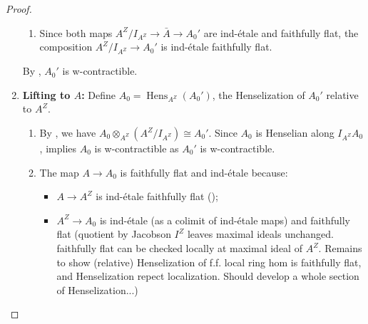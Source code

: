 \begin{proof}
\begin{enumerate}
\begin{enumerate}
            \item Since both maps \(A^Z/I_{A^Z} \to \bar{A} \to A_0'\) are ind-étale and faithfully flat, the composition $A^Z/I_{A^Z} \to A_0'$ is ind-étale faithfully flat.
        \end{enumerate}
        
        By , $A_0'$ is w-contractible.

        \item \textbf{Lifting to $A$:} 
        Define $A_0 = \operatorname{Hens}_{A^Z}(A_0')$, the Henselization of $A_0'$ relative to $A^Z$.
        
        \begin{enumerate}
            \item By , we have $A_0 \otimes_{A^Z} (A^Z/I_{A^Z}) \cong A_0'$. Since $A_0$ is Henselian along $I_{A^Z}A_0$,  implies $A_0$ is w-contractible as $A_0'$ is w-contractible.

            \item The map $A \to A_0$ is faithfully flat and ind-étale because:
            \begin{itemize}
                \item $A \to A^Z$ is ind-étale faithfully flat ();
                \item $A^Z \to A_0$ is ind-étale (as a colimit of ind-étale maps) and faithfully flat {\red(quotient by Jacobson \(I^Z\) leaves maximal ideals unchanged. faithfully flat can be checked locally at maximal ideal of \(A^Z\). Remains to show (relative) Henselization of f.f. local ring hom is faithfully flat, and Henselization repect localization. Should develop a whole section of Henselization...)}
            \end{itemize}
        \end{enumerate}
\end{enumerate}


\end{proof}

